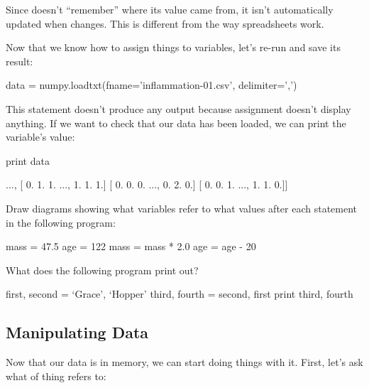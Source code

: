 
Since  doesn't ``remember'' where its value came
from, it isn't automatically updated when  changes.
This is different from the way spreadsheets work.

Now that we know how to assign things to variables, let's re-run
 and save its result:

\begin{VerbIn}
data = numpy.loadtxt(fname='inflammation-01.csv', delimiter=',')
\end{VerbIn}

This statement doesn't produce any output because assignment doesn't
display anything. If we want to check that our data has been loaded, we
can print the variable's value:

\begin{VerbIn}
print data
\end{VerbIn}

\begin{VerbOut}
[[ 0.  0.  1. ...,  3.  0.  0.]
 [ 0.  1.  2. ...,  1.  0.  1.]
 [ 0.  1.  1. ...,  2.  1.  1.]
 ...,
 [ 0.  1.  1. ...,  1.  1.  1.]
 [ 0.  0.  0. ...,  0.  2.  0.]
 [ 0.  0.  1. ...,  1.  1.  0.]]
\end{VerbOut}

\begin{challenge}
  Draw diagrams showing what variables refer to what values after each
  statement in the following program:

\begin{VerbIn}
mass = 47.5
age = 122
mass = mass * 2.0
age = age - 20
\end{VerbIn}
\end{challenge}

\begin{challenge}
  What does the following program print out?
\begin{VerbIn}
first, second = `Grace', `Hopper'
third, fourth = second, first
print third, fourth
\end{VerbIn}
\end{challenge}

\subsection{Manipulating Data}

Now that our data is in memory, we can start doing things with it.
First, let's ask what  of thing
 refers to:

